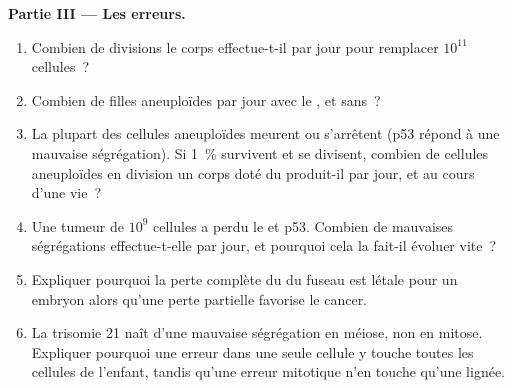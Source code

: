 \begin{problem}
\medskip
\noindent\textbf{Partie III --- Les erreurs.}
\begin{enumerate}[resume]
  \item Combien de divisions le corps effectue-t-il par jour pour
        remplacer $10^{11}$ cellules~?
  \item Combien de filles aneuploïdes par jour avec le , et sans~?
  \item La plupart des cellules aneuploïdes meurent ou s'arrêtent (p53
        répond à une mauvaise ségrégation). Si \qty{1}{\%} survivent et
        se divisent, combien de cellules aneuploïdes en division un
        corps doté du  produit-il par jour, et au
        cours d'une vie~?
  \item Une tumeur de $10^{9}$ cellules a perdu le  et
        p53. Combien de mauvaises ségrégations effectue-t-elle par
        jour, et pourquoi cela la fait-il évoluer vite~?
  \item Expliquer pourquoi la perte complète du  du
        fuseau est létale pour un embryon alors qu'une perte partielle
        favorise le cancer.
  \item La trisomie 21 naît d'une mauvaise ségrégation en méiose, non
        en mitose. Expliquer pourquoi une erreur dans une seule cellule
        y touche toutes les cellules de l'enfant, tandis qu'une erreur
        mitotique n'en touche qu'une lignée.
\end{enumerate}


\end{problem}
